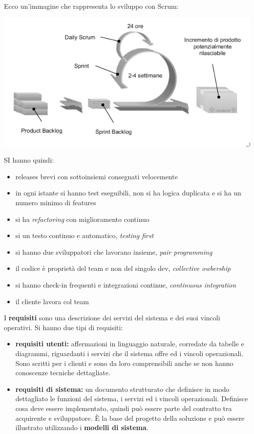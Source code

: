 \documentclass[a4paper,12pt, oneside]{book}
\begin{document}
Ecco un'immagine che rappresenta lo sviluppo con Scrum:
\begin{center}
\includegraphics[scale=0.7]{img/ms11.png}
\end{center}
SI hanno quindi:
\begin{itemize}
\item releases brevi con sottoinsiemi consegnati velocemente
\item in ogni istante si hanno test eseguibili, non si ha logica duplicata e si ha un numero minimo di features
\item si ha \textit{refactoring }con miglioramento continuo
\item si un testo continuo e automatico, \textit{testing first}
\item si hanno due sviluppatori che lavorano insieme, \textit{pair programming}
\item il codice è proprietà del team e non del singolo dev, \textit{collective owbership}
\item si hanno check-in frequenti e integrazioni continue, \textit{continuous integration}
\item il cliente lavora col team
\end{itemize}
I \textbf{requisiti} sono una descrizione dei servizi del sistema e dei suoi vincoli operativi. Si hanno due tipi di requisiti:
\begin{itemize}
\item \textbf{requisiti utenti:} affermazioni in linguaggio naturale, corredate da tabelle e diagrammi, riguardanti i servizi che il sistema offre ed i vincoli operazionali. Sono scritti per i clienti e sono da loro comprensibili anche se non	hanno conoscenze tecniche dettagliate.\\

\item \textbf{requisiti di sistema:} un documento strutturato che definisce in modo dettagliato le funzioni del sistema, i servizi ed i vincoli operazionali. Definisce cosa deve essere implementato, quindi può essere parte del
contratto tra acquirente e sviluppatore. È la base del progetto della soluzione e può essere illustrato utilizzando i \textbf{modelli di sistema}.

\end{itemize}
\end{document}
